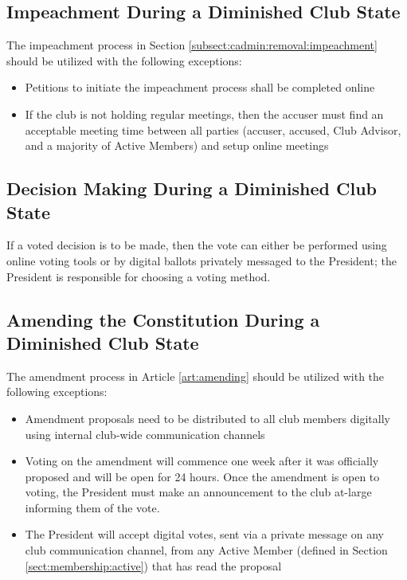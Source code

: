 \documentclass[english,11pt]{article}
\begin{document}
\subsection{Impeachment During a Diminished Club State} \label{subsect:reduced:impeachment}
The impeachment process in Section \ref{subsect:cadmin:removal:impeachment} should be utilized with the following exceptions:

\begin{itemize}
    \item Petitions to initiate the impeachment process shall be completed online
    \item If the club is not holding regular meetings, then the accuser must find an acceptable meeting time between all parties (accuser, accused, Club Advisor, and a majority of Active Members) and setup online meetings
\end{itemize}

\subsection{Decision Making During a Diminished Club State} \label{subsect:reduced:decisions}
If a voted decision is to be made, then the vote can either be performed using online voting tools or by digital ballots privately messaged to the President; the President is responsible for choosing a voting method.

\subsection{Amending the Constitution During a Diminished Club State} \label{subsect:reduced:amending}
The amendment process in Article \ref{art:amending} should be utilized with the following exceptions:

\begin{itemize}
    \item Amendment proposals need to be distributed to all club members digitally using internal club-wide communication channels
    \item Voting on the amendment will commence one week after it was officially proposed and will be open for 24 hours.
        Once the amendment is open to voting, the President must make an announcement to the club at-large informing them of the vote.
    \item The President will accept digital votes, sent via a private message on any club communication channel, from any Active Member (defined in Section \ref{sect:membership:active}) that has read the proposal
\end{itemize}
\end{document}
